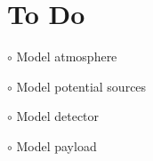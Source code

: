 \documentclass[10pt,a4paper]{article}
\begin{document}
\section*{To Do}

\begin{list}{}{}
\item $\circ$ Model atmosphere
\item $\circ$ Model potential sources
\item $\circ$ Model detector
\item $\circ$ Model payload
\end{list}
\end{document}
